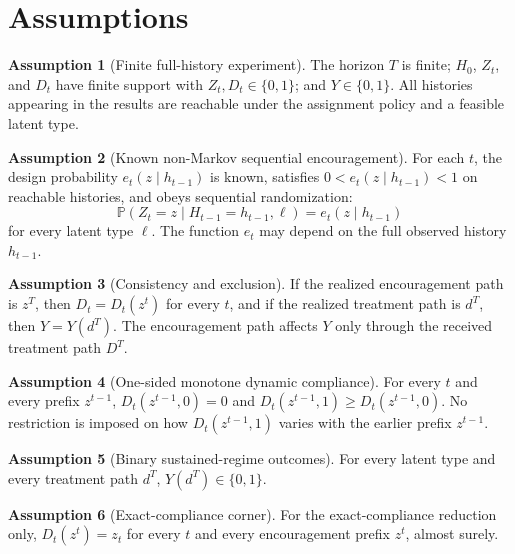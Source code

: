 \documentclass[11pt]{article}
\renewcommand{\Pr}{\mathbb{P}}
\theoremstyle{definition}
\newtheorem{assumption}{Assumption}
\theoremstyle{plain}
\theoremstyle{remark}
\begin{document}
\section{Assumptions}
\begin{assumption}[Finite full-history experiment]\label{ass:finite}
The horizon \(T\) is finite; \(H_0\), \(Z_t\), and \(D_t\) have finite support with \(Z_t,D_t\in\{0,1\}\); and \(Y\in\{0,1\}\).  All histories appearing in the results are reachable under the assignment policy and a feasible latent type.
\end{assumption}

\begin{assumption}[Known non-Markov sequential encouragement]\label{ass:seq-rand}
For each \(t\), the design probability \(e_t(z\mid h_{t-1})\) is known, satisfies \(0<e_t(z\mid h_{t-1})<1\) on reachable histories, and obeys sequential randomization:
\[
\Pr(Z_t=z\mid H_{t-1}=h_{t-1},\ell)=e_t(z\mid h_{t-1})
\]
for every latent type \(\ell\).  The function \(e_t\) may depend on the full observed history \(h_{t-1}\).
\end{assumption}

\begin{assumption}[Consistency and exclusion]\label{ass:consistency-exclusion}
If the realized encouragement path is \(z^T\), then \(D_t=D_t(z^t)\) for every \(t\), and if the realized treatment path is \(d^T\), then \(Y=Y(d^T)\).  The encouragement path affects \(Y\) only through the received treatment path \(D^T\).
\end{assumption}

\begin{assumption}[One-sided monotone dynamic compliance]\label{ass:one-sided}
For every \(t\) and every prefix \(z^{t-1}\), \(D_t(z^{t-1},0)=0\) and \(D_t(z^{t-1},1)\ge D_t(z^{t-1},0)\).  No restriction is imposed on how \(D_t(z^{t-1},1)\) varies with the earlier prefix \(z^{t-1}\).
\end{assumption}

\begin{assumption}[Binary sustained-regime outcomes]\label{ass:bounded}
For every latent type and every treatment path \(d^T\), \(Y(d^T)\in\{0,1\}\).
\end{assumption}

\begin{assumption}[Exact-compliance corner]\label{ass:exact-compliance}
For the exact-compliance reduction only, \(D_t(z^t)=z_t\) for every \(t\) and every encouragement prefix \(z^t\), almost surely.
\end{assumption}
\end{document}
